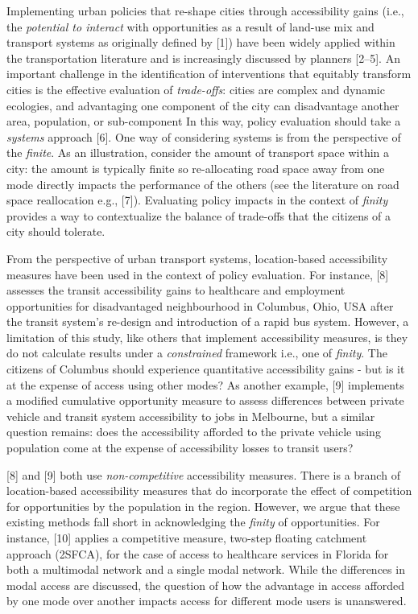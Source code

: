 \documentclass[10pt,letterpaper]{article}
\begin{document}
Implementing urban policies that re-shape cities through accessibility
gains (i.e., the \emph{potential to interact} with opportunities as a
result of land-use mix and transport systems as originally defined by
{[}1{]}) have been widely applied within the transportation literature
and is increasingly discussed by planners {[}2--5{]}. An important
challenge in the identification of interventions that equitably
transform cities is the effective evaluation of \emph{trade-offs}:
cities are complex and dynamic ecologies, and advantaging one component
of the city can disadvantage another area, population, or sub-component
In this way, policy evaluation should take a \emph{systems} approach
{[}6{]}. One way of considering systems is from the perspective of the
\emph{finite}. As an illustration, consider the amount of transport
space within a city: the amount is typically finite so re-allocating
road space away from one mode directly impacts the performance of the
others (see the literature on road space reallocation e.g., {[}7{]}).
Evaluating policy impacts in the context of \emph{finity} provides a way
to contextualize the balance of trade-offs that the citizens of a city
should tolerate.

From the perspective of urban transport systems, location-based
accessibility measures have been used in the context of policy
evaluation. For instance, {[}8{]} assesses the transit accessibility
gains to healthcare and employment opportunities for disadvantaged
neighbourhood in Columbus, Ohio, USA after the transit system's
re-design and introduction of a rapid bus system. However, a limitation
of this study, like others that implement accessibility measures, is
they do not calculate results under a \emph{constrained} framework i.e.,
one of \emph{finity}. The citizens of Columbus should experience
quantitative accessibility gains - but is it at the expense of access
using other modes? As another example, {[}9{]} implements a modified
cumulative opportunity measure to assess differences between private
vehicle and transit system accessibility to jobs in Melbourne, but a
similar question remains: does the accessibility afforded to the private
vehicle using population come at the expense of accessibility losses to
transit users?

{[}8{]} and {[}9{]} both use \emph{non-competitive} accessibility
measures. There is a branch of location-based accessibility measures
that do incorporate the effect of competition for opportunities by the
population in the region. However, we argue that these existing methods
fall short in acknowledging the \emph{finity} of opportunities. For
instance, {[}10{]} applies a competitive measure, two-step floating
catchment approach (2SFCA), for the case of access to healthcare
services in Florida for both a multimodal network and a single modal
network. While the differences in modal access are discussed, the
question of how the advantage in access afforded by one mode over
another impacts access for different mode users is unanswered.
\end{document}

